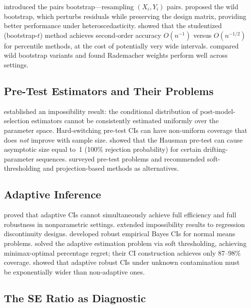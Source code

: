 \documentclass[12pt]{article}
\theoremstyle{definition}
\theoremstyle{remark}
\begin{document}
\citet{efron1979bootstrap} introduced the pairs bootstrap---resampling $(X_i, Y_i)$ pairs. \citet{wu1986jackknife} proposed the wild bootstrap, which perturbs residuals while preserving the design matrix, providing better performance under heteroscedasticity. \citet{hall1992bootstrap} showed that the studentized (bootstrap-$t$) method achieves second-order accuracy $O(n^{-1})$ versus $O(n^{-1/2})$ for percentile methods, at the cost of potentially very wide intervals. \citet{flachaire2005bootstrapping} compared wild bootstrap variants and found Rademacher weights perform well across settings.

\subsection{Pre-Test Estimators and Their Problems}

\citet{leeb2005model,leeb2006can} established an impossibility result: the conditional distribution of post-model-selection estimators cannot be consistently estimated uniformly over the parameter space. Hard-switching pre-test CIs can have non-uniform coverage that does \emph{not} improve with sample size. \citet{guggenberger2010size} showed that the Hausman pre-test can cause asymptotic size equal to~1 (100\% rejection probability) for certain drifting-parameter sequences. \citet{andrews2020generic} surveyed pre-test problems and recommended soft-thresholding and projection-based methods as alternatives.

\subsection{Adaptive Inference}

\citet{low1997nonparametric} proved that adaptive CIs cannot simultaneously achieve full efficiency and full robustness in nonparametric settings. \citet{armstrong2018optimal} extended impossibility results to regression discontinuity designs. \citet{armstrong2022robust} developed robust empirical Bayes CIs for normal means problems. \citet{armstrong2025adapting} solved the adaptive estimation problem via soft thresholding, achieving minimax-optimal percentage regret; their CI construction achieves only 87--98\% coverage. \citet{luo2024adaptive} showed that adaptive robust CIs under unknown contamination must be exponentially wider than non-adaptive ones.

\subsection{The SE Ratio as Diagnostic}
\end{document}
